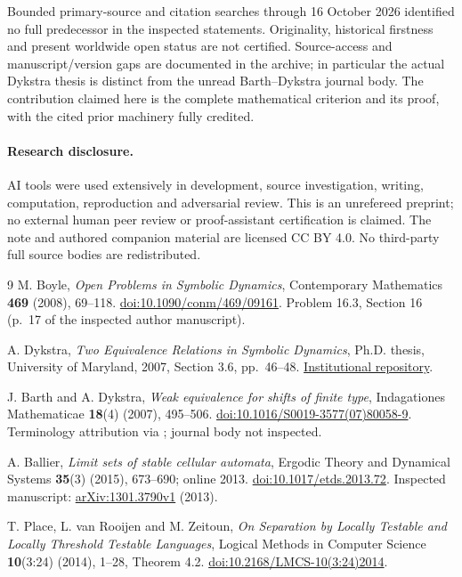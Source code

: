 \documentclass[11pt]{article}
\begin{document}
Bounded primary-source and citation searches through 16 October 2026
identified no full predecessor in the inspected statements.
Originality, historical firstness and present worldwide open status
are not certified. Source-access and manuscript/version gaps are
documented in the archive; in particular the actual Dykstra thesis is
distinct from the unread Barth--Dykstra journal body.
The contribution claimed here is the complete mathematical criterion
and its proof, with the cited prior machinery fully credited.

\paragraph{Research disclosure.}
AI tools were used extensively in development, source investigation,
writing, computation, reproduction and adversarial review. This is an
unrefereed preprint; no external human peer review or proof-assistant
certification is claimed. The note and authored companion material
are licensed CC BY 4.0. No third-party full source bodies are redistributed.

\begin{thebibliography}{9}
M. Boyle, \emph{Open Problems in Symbolic Dynamics},
Contemporary Mathematics \textbf{469} (2008), 69--118.
\href{https://doi.org/10.1090/conm/469/09161}{doi:10.1090/conm/469/09161}.
Problem 16.3, Section 16 (p.~17 of the inspected author manuscript).

A. Dykstra, \emph{Two Equivalence Relations in Symbolic Dynamics},
Ph.D. thesis, University of Maryland, 2007, Section 3.6, pp.~46--48.
\href{https://drum.lib.umd.edu/items/66faa056-fc9f-4423-a340-1311e1a4ed6b}{Institutional repository}.

J. Barth and A. Dykstra, \emph{Weak equivalence for shifts of finite type},
Indagationes Mathematicae \textbf{18}(4) (2007), 495--506.
\href{https://doi.org/10.1016/S0019-3577(07)80058-9}{doi:10.1016/S0019-3577(07)80058-9}.
Terminology attribution via \cite{Ballier}; journal body not inspected.

A. Ballier, \emph{Limit sets of stable cellular automata},
Ergodic Theory and Dynamical Systems \textbf{35}(3) (2015), 673--690;
online 2013.
\href{https://doi.org/10.1017/etds.2013.72}{doi:10.1017/etds.2013.72}.
Inspected manuscript:
\href{https://arxiv.org/abs/1301.3790v1}{arXiv:1301.3790v1} (2013).

T. Place, L. van Rooijen and M. Zeitoun,
\emph{On Separation by Locally Testable and Locally Threshold Testable
Languages}, Logical Methods in Computer Science \textbf{10}(3:24)
(2014), 1--28, Theorem 4.2.
\href{https://doi.org/10.2168/LMCS-10(3:24)2014}{doi:10.2168/LMCS-10(3:24)2014}.
\end{thebibliography}
\end{document}

